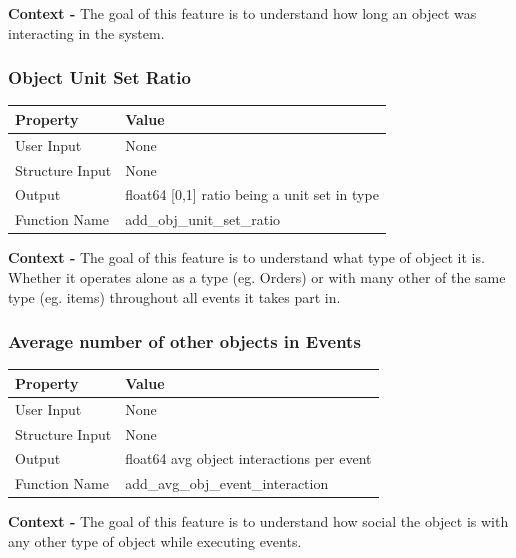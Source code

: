 \documentclass{article}
\begin{document}
\textbf{Context -} The goal of this feature is to understand how long an object was interacting in the system.\\

\subsubsection{Object Unit Set Ratio}
\begin{center}
	\begin{tabular}{| p{3cm} p{7cm} |}
		\hline
		\textbf{Property} & \textbf{Value}\\
		\hline
		User Input & None\\
		Structure Input & None\\
		Output & float64 [0,1] ratio being a unit set in type\\
		Function Name & add\_obj\_unit\_set\_ratio\\
		\hline
	\end{tabular}
\end{center}

\textbf{Context -} The goal of this feature is to understand what type of object it is. Whether it operates alone as a type (eg. Orders) or with many other of the same type (eg. items) throughout all events it takes part in.
\\

\subsubsection{Average number of other objects in Events} 
\begin{center}
	\begin{tabular}{| p{3cm} p{7cm} |}
		\hline
		\textbf{Property} & \textbf{Value}\\
		\hline
		User Input & None\\
		Structure Input & None\\
		Output & float64 avg object interactions per event\\
		Function Name & add\_avg\_obj\_event\_interaction\\
		\hline
	\end{tabular}
\end{center}

\textbf{Context -} The goal of this feature is to understand how social the object is with any other type of object while executing events. 
\\
\end{document}
